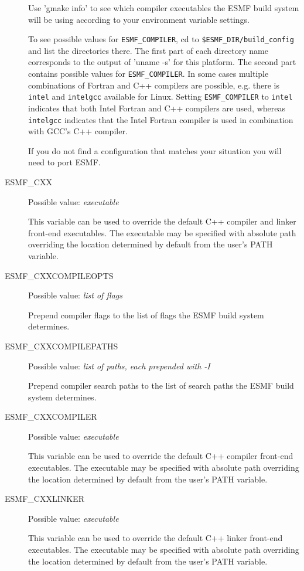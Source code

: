 \begin{description}
Use 'gmake info' to see which compiler executables the ESMF build system will
be using according to your environment variable settings.

To see possible values for {\tt ESMF\_COMPILER}, cd to
{\tt \$ESMF\_DIR/build\_config} and list the directories there. The first part
of each directory name corresponds to the output of 'uname -s' for this
platform. The second part contains possible values for {\tt ESMF\_COMPILER}. In
some cases multiple combinations of Fortran and C++ compilers are possible, e.g.
there is {\tt intel} and {\tt intelgcc} available for Linux. Setting
{\tt ESMF\_COMPILER} to {\tt intel} indicates that both Intel Fortran and
C++ compilers are used, whereas {\tt intelgcc} indicates that the Intel Fortran
compiler is used in combination with GCC's C++ compiler.

If you do not find a configuration that matches your situation you will need to
port ESMF.

\item[ESMF\_CXX]
Possible value: {\em executable}

This variable can be used to override the default C++ compiler and linker
front-end executables. The executable may be specified with absolute path
overriding the location determined by default from the user's PATH variable.

\item[ESMF\_CXXCOMPILEOPTS]
Possible value: {\em list of flags}

Prepend compiler flags to the list of flags the ESMF build system determines.

\item[ESMF\_CXXCOMPILEPATHS]
Possible value: {\em list of paths, each prepended with -I}

Prepend compiler search paths to the list of search paths the ESMF build system
determines.

\item[ESMF\_CXXCOMPILER]
Possible value: {\em executable}

This variable can be used to override the default C++ compiler
front-end executables. The executable may be specified with absolute path
overriding the location determined by default from the user's PATH variable.

\item[ESMF\_CXXLINKER]
Possible value: {\em executable}

This variable can be used to override the default C++ linker
front-end executables. The executable may be specified with absolute path
overriding the location determined by default from the user's PATH variable.


\end{description}
